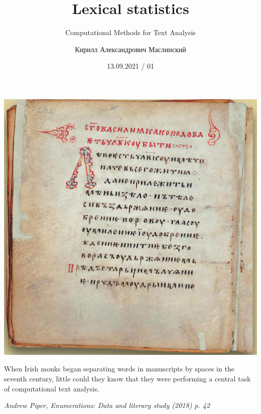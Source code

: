 \documentclass[svgnames]{beamer}
\title[CMTA 01] %
{Lexical statistics}
\subtitle
{Computational Methods for Text Analysis} %
\author%
{Кирилл Александрович Маслинский}
\institute%
{НИУ ВШЭ Санкт-Петербург}
\date%
{13.09.2021 / 01}
\begin{document}
\begin{frame}
  \titlepage
\end{frame}

\begin{frame}[plain]
  \centering
  \Huge\bfseries
\end{frame}


\begin{frame}
  \centering
  \includegraphics[height=.95\textheight]{izbornik1076}
\end{frame}

\begin{frame}[standout]
  When Irish monks began separating words in manuscripts
by spaces in the seventh century, little could they know
that they were performing a central task of computational
text analysis.

\textit{Andrew Piper, Enumerations: Data and literary study (2018) p. 42}
\end{frame}
\end{document}
